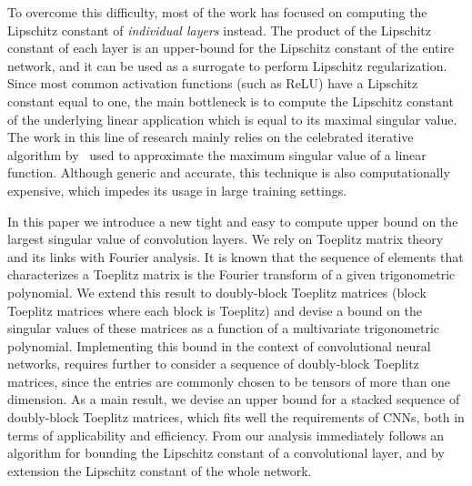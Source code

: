 To overcome this difficulty, most of the work has focused on computing the Lipschitz constant of {\em individual layers} instead.
The product of the Lipschitz constant of each layer is an upper-bound for the Lipschitz constant of the entire network, and it can be used as a surrogate to perform Lipschitz regularization.
Since most common activation functions (such as ReLU) have a Lipschitz constant equal to one, the main bottleneck is to compute the Lipschitz constant of the underlying linear application which is equal to its maximal singular value.
The work in this line of research mainly relies on the celebrated iterative algorithm by~\citet{golub2000eigenvalue} used to approximate the maximum singular value of a linear function.
Although generic and accurate, this technique is also computationally expensive, which impedes its usage in large training settings. 

In this paper we introduce a new tight and easy to compute  upper bound on the largest singular value of convolution layers.
We rely on Toeplitz matrix theory and its links with Fourier analysis.
It is known that the sequence of elements that characterizes a Toeplitz matrix is the Fourier transform of a given trigonometric polynomial.
We extend this result to doubly-block Toeplitz matrices (\ie block Toeplitz matrices where each block is Toeplitz) and devise a bound on the singular values of these matrices as a function of a multivariate trigonometric polynomial.
Implementing this bound in the context of convolutional neural networks, requires further to consider a sequence of doubly-block Toeplitz matrices, since the entries are commonly chosen to be tensors of more than one dimension.
As a main result, we devise an upper bound for a stacked sequence of doubly-block Toeplitz matrices, which fits well the requirements of CNNs, both in terms of applicability and efficiency.
From our analysis immediately follows an algorithm for bounding the Lipschitz constant of a convolutional layer, and by extension the Lipschitz constant of the whole network. 

